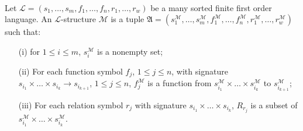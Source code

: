 \begin{definition}\ \\
    Let \( \mathcal{L} \mathop{=} (s_1, \dots, s_m, f_1, \dots, f_n, r_1, \dots, r_w) \) be a many sorted finite first order language. An \( \mathcal{L} \)-structure $\mathcal{M}$ is a tuple \( \mathfrak{A} \mathop{=} (s_1^\mathcal{M}, \dots, s_m^\mathcal{M}, f_1^\mathcal{M}, \dots, f_n^\mathcal{M}, r_1^\mathcal{M}, \dots, r_w^\mathcal{M}) \) such that:
    
    \begin{enumerate}
        \item[(i)] for $1 \leq i \leq m$, $s_i^\mathcal{M}$ is a nonempty set;
        
        \item[(ii)] For each function symbol \( f_j \), \( 1 \leq j \leq n \), with signature \( s_{i_1} \mathop{\times} \dots \mathop{\times} s_{i_k} \mathop{\to} s_{i_{k+1}} \), $1 \leq j \leq n$, \( f_j^\mathcal{M} \) is a function from \( s_{i_1}^\mathcal{M} \mathop{\times} \dots \mathop{\times} s_{i_k}^\mathcal{M} \) to \( s_{i_{k+1}}^\mathcal{M} \);
        
        \item[(iii)] For each relation symbol \( r_j \) with signature \( s_{i_1} \mathop{\times} \dots \mathop{\times} s_{i_k} \), \( R_{r_j} \) is a subset of \( s_{i_1}^\mathcal{M} \mathop{\times} \dots \mathop{\times} s_{i_k}^\mathcal{M} \).
    \end{enumerate}
\end{definition}

